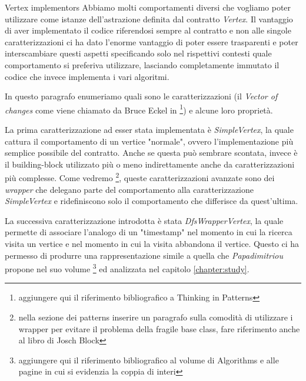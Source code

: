\begin{paragraph}{Vertex implementors}
  Abbiamo molti comportamenti diversi che vogliamo poter utilizzare
  come istanze dell'astrazione definita dal contratto
  \emph{Vertex}. Il vantaggio di aver implementato il codice
  riferendosi sempre al contratto e non alle singole caratterizzazioni
  ci ha dato l'enorme vantaggio di poter essere trasparenti e poter
  interscambiare questi aspetti specificando solo nel rispettivi
  contesti quale comportamento si preferiva utilizzare, lasciando
  completamente immutato il codice che invece implementa i vari
  algoritmi.

  In questo paragrafo enumeriamo quali sono le caratterizzazioni (il
  \emph{Vector of changes} come viene chiamato da Bruce Eckel in
  \footnote{aggiungere qui il riferimento bibliografico a Thinking in
    Patterns}) e alcune loro propriet\`a.

  La prima caratterizzazione ad esser stata implementata \`e
  \emph{SimpleVertex}, la quale cattura il comportamento di un vertice
  "normale", ovvero l'implementazione pi\`u semplice possibile del
  contratto. Anche se questa pu\`o sembrare scontata, invece \`e il
  building-block utilizzato pi\`u o meno indirettamente anche da
  caratterizzazioni pi\`u complesse. Come vedremo \footnote{nella
    sezione dei patterns inserire un paragrafo sulla comodit\`a di
    utilizzare i wrapper per evitare il problema della fragile base
    class, fare riferimento anche al libro di Josch Block}, queste
  caratterizzazioni avanzate sono dei \emph{wrapper} che delegano
  parte del comportamento alla caratterizzazione \emph{SimpleVertex} e
  ridefiniscono solo il comportamento che differisce da quest'ultima.

  La successiva caratterizzazione introdotta \`e stata
  \emph{DfsWrapperVertex}, la quale permette di associare l'analogo di
  un "timestamp" nel momento in cui la ricerca visita un vertice e nel
  momento in cui la visita abbandona il vertice. Questo ci ha permesso
  di produrre una rappresentazione simile a quella che
  \emph{Papadimitriou} propone nel suo volume \footnote{aggiungere qui
    il riferimento bibliografico al volume di Algorithms e alle pagine
    in cui si evidenzia la coppia di interi} ed analizzata nel
  capitolo \ref{chapter:study}.
\end{paragraph}

